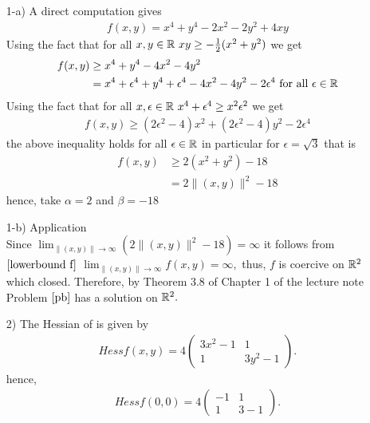 \documentclass{ExerciseSheet}
\newif\ifsolutions
\begin{document}
\ifsolutions
\vskip 0.3cm
\begin{solution}

\begin{itemize}
    \item [1-a)]A direct computation gives \begin{align*}
        f(x, y) = x^4 + y^4 -2x^2 -2y^2 +4xy
    \end{align*}
    Using the fact that for all $x,y\in\mathbb{R}~xy\geq-\frac{1}{2}(x^2+y^2)$ we get
    \begin{align*}
        f(x, y) &\geq x^4 + y^4 -4x^2 -4y^2 \\
                &= x^4 +\epsilon^4 + y^4 +\epsilon^4 -4x^2 -4y^2 -2\epsilon^4 \text{ for all $\epsilon\in\mathbb{R}$}
    \end{align*}
    Using the fact that for all $x,\epsilon\in\mathbb{R}~x^4+\epsilon^4\geq x^2\epsilon^2$ we get
    \begin{align*}
        f(x,y)\geq (2\epsilon^2-4)x^2 + (2\epsilon^2-4)y^2 -2\epsilon^4
    \end{align*}
    the above inequality holds for all $\epsilon\in\mathbb{R}$ in particular for $\epsilon=\sqrt{3}$ that is
    \begin{align}
        f(x,y) &\geq 2(x^2+y^2) - 18\nonumber\\
                &= 2\|(x,y)\|^2 - 18    \label{lowerbound f}    
    \end{align}
    hence, take $\alpha=2$ and $\beta=-18$
    
    \item [1-b)] Application \\
        Since $\displaystyle\lim_{\|(x,y)\|\to\infty}(2\|(x,y)\|^2 - 18)=\infty$ it follows from $\eqref{lowerbound f}$ $\displaystyle\lim_{\|(x,y)\|\to\infty}f(x,y)=\infty,$ thus, $f$ is coercive on $\mathbb{R}^2$ which closed. Therefore, by Theorem 3.8 of Chapter 1 of the lecture note Problem $\ref{pb}$ has a solution on $\mathbb{R}^2.$
    \item [2)] The Hessian of is given by
                \begin{align*}
                    Hess f(x,y)=4\begin{pmatrix}
                        3x^2-1 & 1\\
                        1 & 3y^2-1
                    \end{pmatrix}.
                \end{align*}
    hence,
     \begin{align*}
                    Hess f(0,0)=4\begin{pmatrix}
                        -1 & 1\\
                        1 & 3-1
                    \end{pmatrix}.
                \end{align*}
\end{itemize}

 
\end{solution}
\end{document}
